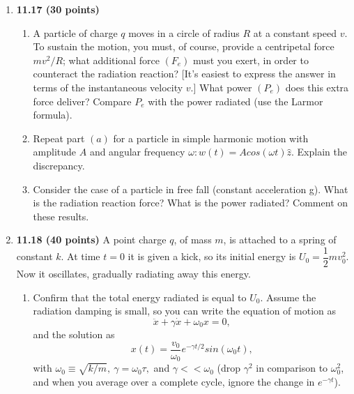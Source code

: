 \documentclass[fleqn]{article}
\begin{document}
\begin{enumerate}
    \pagebreak

    \item \textbf{11.17 (30 points)} 
    \begin{enumerate}
      \item A particle of charge $q$ moves in a circle of radius $R$ at a constant speed $v$. To sustain the motion, 
      you must, of course, provide a centripetal force $m v^2/R$; what additional force $(F_e)$ must you exert, 
      in order to counteract the radiation reaction? [It's easiest to express the answer in terms of the instantaneous
      velocity $v$.] What power $(P_e)$ does this extra force deliver? Compare $P_e$ with the
      power radiated (use the Larmor formula).

      \item Repeat part $(a)$ for a particle in simple harmonic motion with amplitude $A$ and
      angular frequency $\omega: w(t) = A cos(\omega t) \hat{z}$. Explain the discrepancy.


      \item Consider the case of a particle in free fall (constant acceleration g). What is
      the radiation reaction force? What is the power radiated? Comment on these
      results.


    \end{enumerate}

    \item \textbf{11.18 (40 points)} A point charge $q$, of mass $m$, is attached to a spring of constant $k$.
    At time $t=0$ it is given a kick, so its initial energy is $U_0=\dfrac{1}{2} m v^2_0$. Now it oscillates,
    gradually radiating away this energy.
    \begin{enumerate}
      \item Confirm that the total energy radiated is equal to $U_0$. Assume the radiation
      damping is small, so you can write the equation of motion as
      $$
        \ddot{x}+\gamma \dot{x}+\omega_0 x=0,
      $$
      and the solution as
      $$
        x(t)=\dfrac{v_0}{\omega_0} e^{-\gamma t/2} sin(\omega_0 t),
      $$
      with $\omega_0 \equiv \sqrt{k/m}, ~ \gamma=\omega_0 \tau,$ and $\gamma << \omega_0$ (drop $\gamma^2$ in comparison 
      to $\omega^2_0$, and when you average over a complete cycle, ignore the change in $e^{-\gamma t}$).


\end{enumerate}
\end{enumerate}
\end{document}
